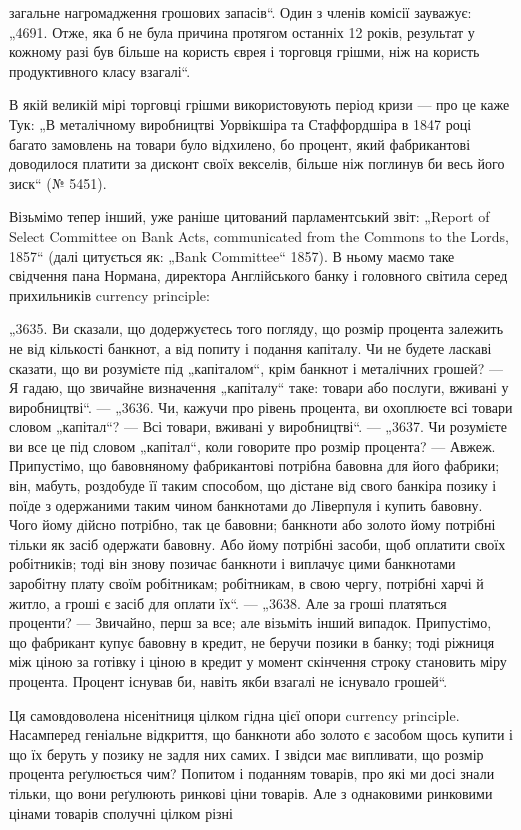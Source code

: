 \parcont{}  %
загальне нагромадження грошових запасів“. Один з членів комісії
зауважує: „4691. Отже, яка б не була причина протягом
останніх 12 років, результат у кожному разі був більше на користь єврея і торговця грішми, ніж на
користь продуктивного
класу взагалі“.

В якій великій мірі торговці грішми використовують період
кризи — про це каже Тук: „В металічному виробництві Уорвікшіра та Стаффордшіра в 1847 році багато
замовлень на товари
було відхилено, бо процент, який фабрикантові доводилося платити за дисконт своїх векселів, більше
ніж поглинув би весь
його зиск“ (№ 5451).

Візьмімо тепер інший, уже раніше цитований парламентський
звіт: „\textenglish{Report of Select Committee on Bank Acts, communicated from
the Commons to the Lords}, 1857“ (далі цитується як: „Bank Committee“ 1857). В ньому маємо таке
свідчення пана Нормана, директора Англійського банку і головного світила серед прихильників currency
principle:

„3635. Ви сказали, що додержуєтесь того погляду, що розмір
процента залежить не від кількості банкнот, а від попиту і подання капіталу. Чи не будете ласкаві
сказати, що ви розумієте під
„капіталом“, крім банкнот і металічних грошей? — Я гадаю, що звичайне визначення „капіталу“ таке:
товари або послуги, вживані
у виробництві“. — „3636. Чи, кажучи про рівень процента, ви
охоплюєте всі товари словом „капітал“? — Всі товари, вживані
у виробництві“. — „3637. Чи розумієте ви все це під словом
„капітал“, коли говорите про розмір процента? — Авжеж. Припустімо, що бавовняному фабрикантові
потрібна бавовна для його
фабрики; він, мабуть, роздобуде її таким способом, що дістане
від свого банкіра позику і поїде з одержаними таким чином
банкнотами до Ліверпуля і купить бавовну. Чого йому дійсно
потрібно, так це бавовни; банкноти або золото йому потрібні
тільки як засіб одержати бавовну. Або йому потрібні засоби,
щоб оплатити своїх робітників; тоді він знову позичає банкноти
і виплачує цими банкнотами заробітну плату своїм робітникам;
робітникам, в свою чергу, потрібні харчі й житло, а гроші є
засіб для оплати їх“. — „3638. Але за гроші платяться проценти? — Звичайно, перш за все; але
візьміть інший випадок. Припустімо, що фабрикант купує бавовну в кредит, не беручи позики
в банку; тоді ріжниця між ціною за готівку і ціною в кредит
у момент скінчення строку становить міру процента. Процент
існував би, навіть якби взагалі не існувало грошей“.

Ця самовдоволена нісенітниця цілком гідна цієї опори currency principle. Насамперед геніальне
відкриття, що банкноти
або золото є засобом щось купити і що їх беруть у позику не
задля них самих. І звідси має випливати, що розмір процента
реґулюється чим? Попитом і поданням товарів, про які ми досі
знали тільки, що вони реґулюють ринкові ціни товарів. Але
з однаковими ринковими цінами товарів сполучні цілком різні
\parbreak{}  %
